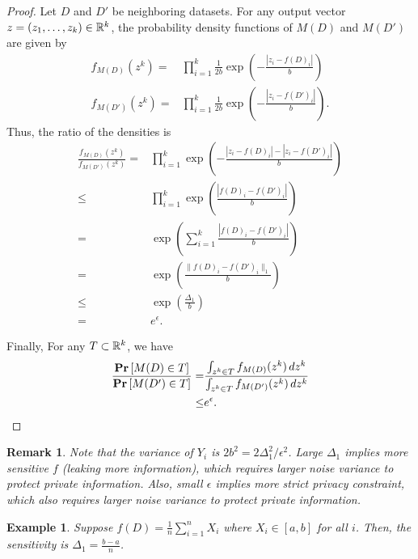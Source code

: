 \documentclass[11pt, a4paper]{article}
\newtheorem{remark}{Remark}
\newtheorem{example}{Example}
\begin{document}
\begin{proof}
Let $D$ and $D'$ be neighboring datasets.
For any output vector $z = (z_1, \dots, z_k)\in\mathbb{R}^k$,
the probability density functions of $M(D)$ and $M(D')$ are given by
\begin{align}
    f_{M(D)} (z^k)=& \prod_{i=1}^k \frac{1}{2b} \exp\left( - \frac{|z_i-f(D)_i|}{b}\right)\\
    f_{M(D')}(z^k) =& \prod_{i=1}^k \frac{1}{2b} \exp\left( - \frac{|z_i-f(D')_i|}{b}\right).
\end{align}
Thus, the ratio of the densities is
\begin{align}
    \frac{f_{M(D)}(z^k)}{f_{M(D')}(z^k)} 
    =& \prod_{i=1}^k \exp\left( - \frac{|z_i-f(D)_i| - |z_i-f(D')_i|}{b}\right)\\
    \leq & \prod_{i=1}^k \exp\left( \frac{|f(D)_i-f(D')_i|}{b}\right)\\
    = & \exp\left( \sum_{i=1}^k\frac{|f(D)_i-f(D')_i|}{b}\right)\\
    = & \exp\left( \frac{\|f(D)_i-f(D')_i\|_1}{b}\right)\\
    \leq & \exp\left( \frac{\Delta_1}{b}\right)\\
    =& e^{\epsilon}.
\end{align}

Finally, For any $T\subset\mathbb{R}^k$, we have
\begin{align}
    \frac{\Prob{M(D)\in T}} {\Prob{M(D')\in T}}
    =&\frac{\int_{z^k\in T} f_{M(D)}(z^k) \, dz^k}{\int_{z^k\in T}f_{M(D')}(z^k) \, dz^k} \\
    \leq& e^\epsilon.
\end{align}

\end{proof}

\begin{remark}
    Note that the variance of $Y_i$ is $2b^2 = 2\Delta_1^2/\epsilon^2$.
    Large $\Delta_1$ implies more sensitive $f$ (leaking more information), 
    which requires larger noise variance to protect private information.
    Also, small $\epsilon$ implies more strict privacy constraint,
    which also requires larger noise variance to protect private information.
\end{remark}

\begin{example}
    Suppose $f(D) = \frac{1}{n} \sum_{i=1}^n X_i$ where $X_i \in [a, b]$ for all $i$.
    Then, the sensitivity is $\Delta_1 = \frac{b-a}{n}$.
\end{example}
\end{document}
